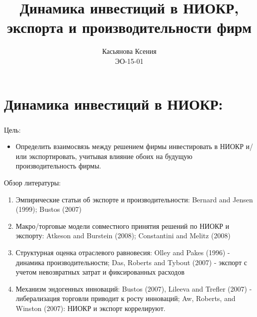 \documentclass[c, dvipsnames]{beamer}  %
\title[Динамика инвестиций в НИОКР]{Динамика инвестиций в НИОКР,\\ экспорта и производительности фирм}
\author[Касьянова Ксения]{Касьянова Ксения \\ \smallskip \scriptsize ЭО-15-01 }
\institute[РАНХиГС]{ \uppercase{
  Российская Академия Народного Хозяйства и  \\ Государственной Службы при Президенте Российской Федерации}}
\date{}
\begin{document}
\frame[plain]{\titlepage}	%




\section{Динамика инвестиций в НИОКР:}

\begin{frame}[shrink=3]
\frametitle{\insertsection} 
\begin{block}{Цель:}
	\begin{itemize}
		\item  Определить взаимосвязь между решением фирмы инвестировать в НИОКР и/или экспортировать, учитывая влияние обоих на
		будущую производительность фирмы. 
	\end{itemize}
	
\end{block}



\begin{block}{Обзор литературы:}
	
\begin{enumerate}
	\item Эмпирические статьи об экспорте и производительности: Bernard and Jensen (1999); Bustos (2007)
	\item  Макро/торговые модели совместного принятия решений по НИОКР и экспорту:
	Atkeson and Burstein (2008); Constantini and Melitz (2008)
	\item Структурная оценка отраслевого равновесия:
	Olley and Pakes (1996) - динамика производительности;
	Das, Roberts and Tybout (2007) - экспорт с учетом  невозвратных затрат и фиксированных расходов
	\item  Механизм эндогенных инноваций:
	Bustos (2007), Lileeva and Trefler (2007) - либерализация торговли приводит к росту инноваций;
	Aw, Roberts, and Winston (2007): НИОКР и экспорт
	коррелируют.
	
\end{enumerate}

\end{block}



\end{frame}
\end{document}
